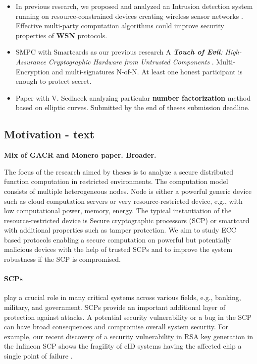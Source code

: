 \documentclass[
  digital, %
  twoside, %
  table,   %
  lof,     %
  lot,     %
]{fithesis3}
\theoremstyle{definition}
\theoremstyle{remark}
\begin{document}
\begin{ecmmnt}
\begin{itemize}
    \item In previous research, we proposed and analyzed an Intrusion detection system running on resource-constrained devices creating wireless sensor networks \cite{wsnprotectlayer}. Effective multi-party computation algorithms could improve security properties of {\bf{WSN}} protocols.
    
    \item SMPC with Smartcards as our previous research A {\it {\bf{Touch of Evil}}: High-Assurance Cryptographic Hardware from Untrusted Components} \cite{2017-ccs-mavroudis}. Multi-Encryption and multi-signatures N-of-N. At least one honest participant is enough to protect secret.
    
    \item Paper with V. Sedlacek analyzing particular {\bf{number factorization}} method based on elliptic curves. Submitted by the end of theses submission deadline.

\end{itemize}

\subsection{Motivation - text}

    {\bf{Mix of GACR and Monero paper. Broader.}}
    
    The focus of the research aimed by theses is to analyze a secure distributed function computation in restricted environments. The computation model consists of multiple heterogeneous nodes. Node is either a powerful generic device such as cloud computation servers or very resource-restricted device, e.g., with low computational power, memory, energy. The typical instantiation of the resource-restricted device is Secure cryptographic processors (SCP) or smartcard with additional properties such as tamper protection. 
    We aim to study ECC based protocols enabling a secure computation on powerful but potentially malicious devices with the help of trusted SCPs and to improve the system robustness if the SCP is compromised.
    
    \paragraph{SCPs} play a crucial role in many critical systems across various fields, e.g., banking, military, and government.
    SCPs provide an important additional layer of protection against attacks. A potential security vulnerability or a bug in the SCP can have broad consequences and compromise overall system security. For example, our recent discovery of a security vulnerability in RSA key generation in the Infineon SCP shows the fragility of eID systems having the affected chip a single point of failure \cite{2017-ccs-nemec}. 
    

\end{ecmmnt}
\end{document}
